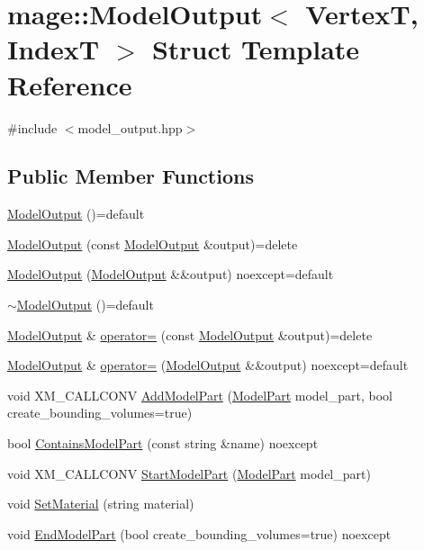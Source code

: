 \hypertarget{structmage_1_1_model_output}{}\section{mage\+:\+:Model\+Output$<$ VertexT, IndexT $>$ Struct Template Reference}
\label{structmage_1_1_model_output}


{\ttfamily \#include $<$model\+\_\+output.\+hpp$>$}

\subsection*{Public Member Functions}
\begin{DoxyCompactItemize}
\item 
\hyperlink{structmage_1_1_model_output_a87c3036fd1e97045c6075ed729a5e8f2}{Model\+Output} ()=default
\item 
\hyperlink{structmage_1_1_model_output_a8aed21d15e5c30a8ec200edf01e5f8fb}{Model\+Output} (const \hyperlink{structmage_1_1_model_output}{Model\+Output} \&output)=delete
\item 
\hyperlink{structmage_1_1_model_output_af0e7804a3b375b18fc7bfba1c6ee84bf}{Model\+Output} (\hyperlink{structmage_1_1_model_output}{Model\+Output} \&\&output) noexcept=default
\item 
\hyperlink{structmage_1_1_model_output_a547ab5a433adfb253fab3431ad4c0dce}{$\sim$\+Model\+Output} ()=default
\item 
\hyperlink{structmage_1_1_model_output}{Model\+Output} \& \hyperlink{structmage_1_1_model_output_a5d206619319fed85a4add63ee0532cac}{operator=} (const \hyperlink{structmage_1_1_model_output}{Model\+Output} \&output)=delete
\item 
\hyperlink{structmage_1_1_model_output}{Model\+Output} \& \hyperlink{structmage_1_1_model_output_a090d74bebb6045c11952cc57fb1aa220}{operator=} (\hyperlink{structmage_1_1_model_output}{Model\+Output} \&\&output) noexcept=default
\item 
void X\+M\+\_\+\+C\+A\+L\+L\+C\+O\+NV \hyperlink{structmage_1_1_model_output_a4cec4d8729150a188605daabd33dd2ba}{Add\+Model\+Part} (\hyperlink{structmage_1_1_model_part}{Model\+Part} model\+\_\+part, bool create\+\_\+bounding\+\_\+volumes=true)
\item 
bool \hyperlink{structmage_1_1_model_output_a172145ecca77ad45f7adc8f4c4f905ec}{Contains\+Model\+Part} (const string \&name) noexcept
\item 
void X\+M\+\_\+\+C\+A\+L\+L\+C\+O\+NV \hyperlink{structmage_1_1_model_output_a204f16513741ebfacb7a287969629956}{Start\+Model\+Part} (\hyperlink{structmage_1_1_model_part}{Model\+Part} model\+\_\+part)
\item 
void \hyperlink{structmage_1_1_model_output_a88f2dff99e178b84637ae945ba5f6f53}{Set\+Material} (string material)
\item 
void \hyperlink{structmage_1_1_model_output_a24619ec445b3a122ce4b50a6f2f74158}{End\+Model\+Part} (bool create\+\_\+bounding\+\_\+volumes=true) noexcept
\end{DoxyCompactItemize}
